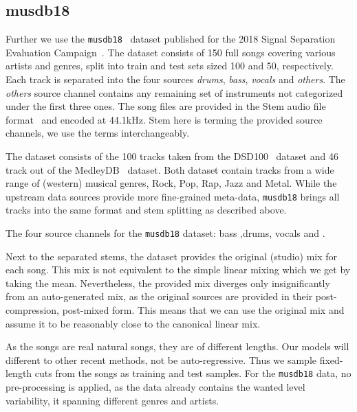 \subsection{musdb18}
Further we use the \texttt{musdb18}~\cite{rafiiMUSDB182017} dataset published for the 2018 Signal Separation Evaluation Campaign~\cite{stoter20182018}. The dataset consists of 150 full songs covering various artists and genres, split into train and test sets sized 100 and 50, respectively. Each track is separated into the four sources \emph{drums}, \emph{bass}, \emph{vocals} and \emph{others}. The \emph{others} source channel contains any remaining set of instruments not categorized under the first three ones. The song files are provided in the Stem audio file format~\cite{nativeinstrumentsStem} and encoded at 44.1kHz. Stem here is terming the provided source channels, we use the terms interchangeably.

The dataset consists of the 100 tracks taken from the DSD100~\cite{SiSEC16} dataset and 46 track out of the MedleyDB~\cite{bittnerMedleyDB2016} dataset. Both dataset contain tracks from a wide range of (western) musical genres, Rock, Pop, Rap, Jazz and Metal. While the upstream data sources provide more fine-grained meta-data, \texttt{musdb18} brings all tracks into the same format and stem splitting as described above.

\begin{marginfigure}[3em]
    \resizebox{\textwidth}{!}{%
    }%
    \caption{The four source channels for the \texttt{musdb18} dataset: bass ,drums, vocals and .}%
    \label{fig:musdb_data}
\end{marginfigure}

Next to the separated stems, the dataset provides the original (studio) mix for each song. This mix is not equivalent to the simple linear mixing which we get by taking the mean. Nevertheless, the provided mix diverges only insignificantly from an auto-generated mix, as the original sources are provided in their post-compression, post-mixed form. This means that we can use the original mix and assume it to be reasonably close to the canonical linear mix.

As the songs are real natural songs, they are of different lengths. Our models will different to other recent methods, not be auto-regressive. Thus we sample fixed-length cuts from the songs as training and test samples. For the \texttt{musdb18} data, no pre-processing is applied, as the data already contains the wanted level variability, it spanning different genres and artists.

